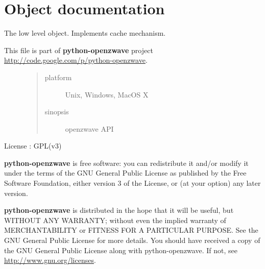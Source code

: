 \documentclass[letterpaper,10pt,english]{sphinxmanual}
\begin{document}
\section{Object documentation}
\label{object:object-documentation}\label{object::doc}
The low level object. Implements cache mechanism.
\label{object:module-openzwave.object}\label{object:module-openzwave.object}\begin{description}
\item[{This file is part of \textbf{python-openzwave} project \href{http://code.google.com/p/python-openzwave}{http://code.google.com/p/python-openzwave}.}] \leavevmode\begin{quote}\begin{description}
\item[{platform}] \leavevmode
Unix, Windows, MacOS X

\item[{sinopsis}] \leavevmode
openzwave API

\end{description}\end{quote}

\end{description}

License : GPL(v3)

\textbf{python-openzwave} is free software: you can redistribute it and/or modify
it under the terms of the GNU General Public License as published by
the Free Software Foundation, either version 3 of the License, or
(at your option) any later version.

\textbf{python-openzwave} is distributed in the hope that it will be useful,
but WITHOUT ANY WARRANTY; without even the implied warranty of
MERCHANTABILITY or FITNESS FOR A PARTICULAR PURPOSE. See the
GNU General Public License for more details.
You should have received a copy of the GNU General Public License
along with python-openzwave. If not, see \href{http://www.gnu.org/licenses}{http://www.gnu.org/licenses}.
\end{document}
